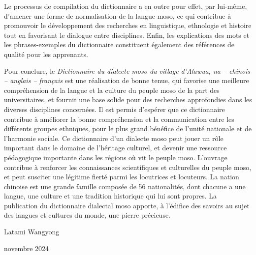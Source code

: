 Le processus de compilation du dictionnaire a en outre pour effet, par lui-même, d’amener une forme de normalisation de la langue moso, ce qui contribue à promouvoir le développement des recherches en linguistique, ethnologie et histoire tout en favorisant le dialogue entre disciplines. Enfin, les explications des mots et les phrases-exemples du dictionnaire constituent également des références de qualité pour les apprenants.

Pour conclure, le \emph{Dictionnaire du dialecte moso du village d'Alawua, na – chinois – anglais – français} est une réalisation de bonne tenue, qui favorise une meilleure compréhension de la langue et la culture du peuple moso de la part des universitaires, et fournit une base solide pour des recherches approfondies dans les diverses disciplines concernées. Il est permis d’espérer que ce dictionnaire contribue à améliorer la bonne compréhension et la communication entre les différents groupes ethniques, pour le plus grand bénéfice de l'unité nationale et de l'harmonie sociale. Ce dictionnaire d’un dialecte moso peut jouer un rôle important dans le domaine de l'héritage culturel, et devenir une ressource pédagogique importante dans les régions où vit le peuple moso. L’ouvrage contribue à renforcer les connaissances scientifiques et culturelles du peuple moso, et peut susciter une légitime fierté parmi les locutrices et locuteurs. La nation chinoise est une grande famille composée de 56 nationalités, dont chacune a une langue, une culture et une tradition historique qui lui sont propres. La publication du dictionnaire dialectal moso apporte, à l’édifice des savoirs au sujet des langues et cultures du monde, une pierre précieuse.


{\raggedleft Latami Wangyong \par}

{\raggedleft novembre 2024\par}

